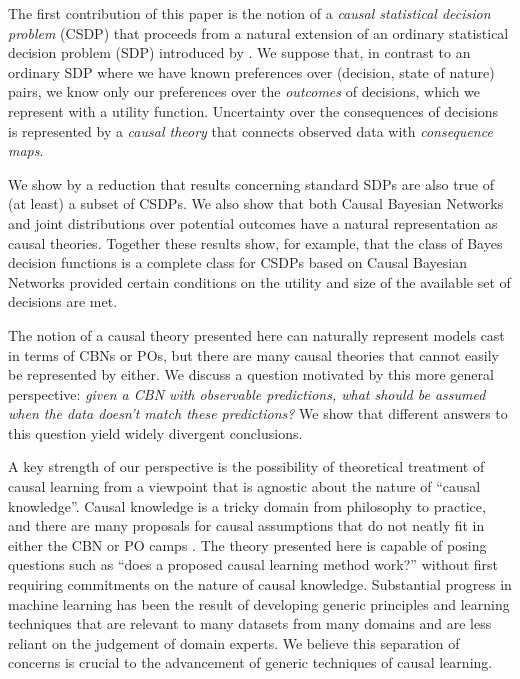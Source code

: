The first contribution of this paper is the notion of a \emph{causal statistical decision problem} (CSDP) that proceeds from a natural extension of an ordinary statistical decision problem (SDP) introduced by \citep{wald_statistical_1950}. We suppose that, in contrast to an ordinary SDP where we have known preferences over (decision, state of nature) pairs, we know only our preferences over the \emph{outcomes} of decisions, which we represent with a utility function. Uncertainty over the consequences of decisions is represented by a \emph{causal theory} that connects observed data with \emph{consequence maps}. 

We show by a reduction that results concerning standard SDPs are also true of (at least) a subset of CSDPs.  We also show that both Causal Bayesian Networks and joint distributions over potential outcomes have a natural representation as causal theories. Together these results show, for example, that the class of Bayes decision functions is a complete class for CSDPs based on Causal Bayesian Networks provided certain conditions on the utility and size of the available set of decisions are met.

The notion of a causal theory presented here can naturally represent models cast in terms of CBNs or POs, but there are many causal theories that cannot easily be represented by either. We discuss a question motivated by this more general perspective: \emph{given a CBN with observable predictions, what should be assumed when the data doesn't match these predictions?} We show that different answers to this question yield widely divergent conclusions.

A key strength of our perspective is the possibility of theoretical treatment of causal learning from a viewpoint that is agnostic about the nature of ``causal knowledge''. Causal knowledge is a tricky domain from philosophy to practice, and there are many proposals for causal assumptions that do not neatly fit in either the CBN or PO camps \citep{bongers_theoretical_2016,dawid_beware_2010,bengio_meta-transfer_2019}. The theory presented here is capable of posing questions such as ``does a proposed causal learning method work?'' without first requiring commitments on the nature of causal knowledge. Substantial progress in machine learning has been the result of developing generic principles and learning techniques that are relevant to many datasets from many domains and are less reliant on the judgement of domain experts. We believe this separation of concerns is crucial to the advancement of generic techniques of causal learning.

